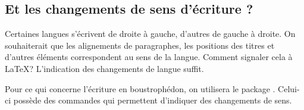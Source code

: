 \subsection{Et les changements de sens d'écriture ?}

Certaines langues s'écrivent de droite à gauche, d'autres de gauche à droite. On souhaiterait que les alignements de paragraphes, les positions des titres et d'autres éléments correspondent au sens de la langue. 
Comment signaler cela à \LaTeX ? L'indication des changements de langue suffit. 

\begin{plusloins}
Pour ce qui concerne l'écriture en boustrophédon, on utilisera le package . Celui-ci possède des  commandes qui permettent d'indiquer des changements de sens. 
\end{plusloins}
